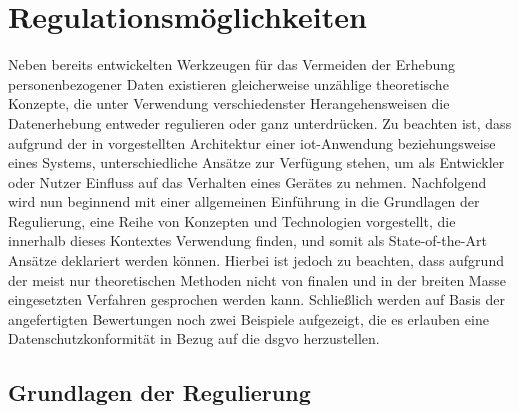 \section{Regulationsmöglichkeiten}
\label{sec:Regulationsmöglichkeiten}

Neben bereits entwickelten Werkzeugen für das Vermeiden der Erhebung personenbezogener Daten existieren gleicherweise unzählige theoretische Konzepte, die unter Verwendung verschiedenster Herangehensweisen die Datenerhebung entweder regulieren oder ganz unterdrücken. 
Zu beachten ist, dass aufgrund der in  vorgestellten Architektur einer \ac{iot}-Anwendung beziehungsweise eines Systems, unterschiedliche Ansätze zur Verfügung stehen, um als Entwickler oder Nutzer Einfluss auf das Verhalten eines Gerätes zu nehmen. 
Nachfolgend wird nun beginnend mit einer allgemeinen Einführung in die Grundlagen der Regulierung, eine Reihe von Konzepten und Technologien vorgestellt, die innerhalb dieses Kontextes Verwendung finden, und somit als State-of-the-Art Ansätze deklariert werden können. Hierbei ist jedoch zu beachten, dass aufgrund der meist nur theoretischen Methoden nicht von finalen und in der breiten Masse eingesetzten Verfahren gesprochen werden kann. 
Schließlich werden auf Basis der angefertigten Bewertungen noch zwei Beispiele aufgezeigt, die es erlauben eine Datenschutzkonformität in Bezug auf die \ac{dsgvo} herzustellen.

\subsection{Grundlagen der Regulierung}
\label{sec:Regulationsmöglichkeiten:ssec:Grundlagen der Regulierung}

